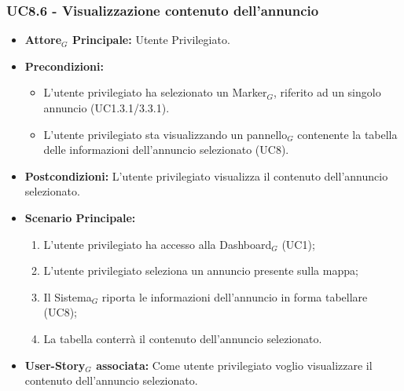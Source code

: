 \documentclass[10pt]{article}
\begin{document}
\begin{justify}
 \subsubsection{\textbf{UC8.6 - Visualizzazione contenuto dell'annuncio}}
 \begin{itemize}
     \item \textbf{Attore$_G$ Principale:} Utente Privilegiato.
     \item \textbf{Precondizioni:}
       \begin{itemize}
    	        \item L'utente privilegiato ha selezionato un Marker$_G$, riferito ad un singolo annuncio (UC1.3.1/3.3.1).
          \item L'utente privilegiato sta visualizzando un pannello$_G$ contenente la tabella delle informazioni dell'annuncio selezionato (UC8).
       \end{itemize}
     \item \textbf{Postcondizioni:} L'utente privilegiato visualizza il contenuto dell'annuncio selezionato.
     \item \textbf{Scenario Principale:}
        \begin{enumerate}
            \item L'utente privilegiato ha accesso alla Dashboard$_G$ (UC1);
            \item L'utente privilegiato seleziona un annuncio presente sulla mappa;
            \item Il Sistema$_G$ riporta le informazioni dell'annuncio in forma tabellare (UC8);
            \item La tabella conterrà il contenuto dell'annuncio selezionato.
        \end{enumerate}
     \item \textbf{User-Story$_G$ associata:} Come utente privilegiato voglio visualizzare il contenuto dell'annuncio selezionato. 
 \end{itemize}

\end{justify}
\end{document}
